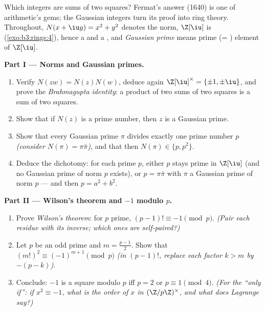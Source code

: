 \begin{problem}\label{pb:b3:rings:1}
Which integers are sums of two squares? Fermat's answer (1640) is
one of arithmetic's gems; the Gaussian integers turn its proof
into ring theory. Throughout, $N(x + \iu y) = x^2 + y^2$ denotes
the norm, $\Z[\iu]$ is  (\cref{exo:b3:rings:4}), hence a
 and a , and \emph{Gaussian prime} means prime (=
) element of $\Z[\iu]$.

\medskip
\noindent\textbf{Part I --- Norms and Gaussian primes.}
\begin{enumerate}
  \item Verify $N(zw) = N(z)N(w)$, deduce again $\Z[\iu]^\times =
        \{\pm1, \pm\iu\}$, and prove the \emph{Brahmagupta
        identity}: a product of two sums of two squares is a sum
        of two squares.
  \item Show that if $N(z)$ is a prime number, then $z$ is a
        Gaussian prime.
  \item Show that every Gaussian prime $\pi$ divides exactly one
        prime number $p$ \emph{(consider $N(\pi) = \pi\bar\pi$)},
        and that then $N(\pi) \in \{p, p^2\}$.
  \item Deduce the dichotomy: for each prime $p$, either $p$
        stays prime in $\Z[\iu]$ (and no Gaussian prime of norm
        $p$ exists), or $p = \pi\bar\pi$ with $\pi$ a Gaussian
        prime of norm $p$ --- and then $p = a^2 + b^2$.
\end{enumerate}

\medskip
\noindent\textbf{Part II --- Wilson's theorem and $-1$ modulo
$p$.}
\begin{enumerate}[resume]
  \item Prove \emph{Wilson's theorem}: for $p$ prime, $(p-1)!
        \equiv -1 \pmod p$. \emph{(Pair each residue with its
        inverse; which ones are self-paired?)}
  \item Let $p$ be an odd prime and $m = \frac{p-1}2$. Show that
        $(m!)^2 \equiv (-1)^{m+1} \pmod p$ \emph{(in $(p-1)!$,
        replace each factor $k > m$ by $-(p - k)$)}.
  \item Conclude: $-1$ is a square modulo $p$ iff $p = 2$ or $p
        \equiv 1 \pmod 4$. \emph{(For the ``only if'': if $x^2
        \equiv -1$, what is the order of $x$ in $(\Z/p\Z)^\times$,
        and what does Lagrange say?)}
\end{enumerate}


\end{problem}
